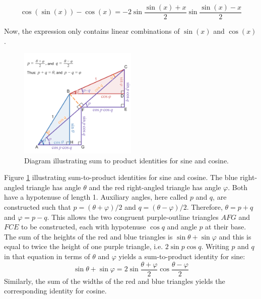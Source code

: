 \begin{equation*}
    \cos(\sin(x)) - \cos(x) = -2 \sin\frac{\sin(x) + x}{2} \sin\frac{\sin(x) - x}{2}
\end{equation*}

Now, the expression only contains linear combinations of 
$\sin(x)$ and $\cos(x)$.

\begin{figure}
    \centering
    \label{fig:Diagram_illustrating_sum_to_product_identities_for_sine_and_cosine}
    \includegraphics[width=0.5\textwidth]{figure/Diagram_illustrating_sum_to_product_identities_for_sine_and_cosine.png}
    \caption{Diagram illustrating sum to product identities for sine and cosine.}
\end{figure}

Figure \ref{fig:Diagram_illustrating_sum_to_product_identities_for_sine_and_cosine} 
illustrating sum-to-product identities for sine and cosine. 
The blue right-angled triangle has angle $\theta$ and the 
red right-angled triangle has angle $\varphi$. 
Both have a hypotenuse of length 1. Auxiliary angles, here called
$p$ and $q$, are constructed such that $p = (\theta + \varphi) / 2$ 
and $q = (\theta - \varphi) / 2$. Therefore, $\theta = p + q$
and $\varphi = p - q$.
This allows the two congruent purple-outline triangles
$AFG$ and $FCE$ to be constructed, 
each with hypotenuse $\cos q$ and angle $p$ at their base.
The sum of the heights of the red and blue triangles is
$\sin \theta + \sin \varphi$  and this is equal to 
twice the height of one purple triangle, 
i.e. $2 \sin p \cos q$. Writing $p$ and $q$ in that
equation in terms of $\theta$ and $\varphi$ yields 
a sum-to-product identity for sine:
\[
    \sin \theta + \sin \varphi = 2 \sin \dfrac{\theta + \varphi}{2} \cos \dfrac{\theta - \varphi}{2}
\]
Similarly, the sum of the widths of 
the red and blue triangles yields the corresponding identity for cosine.

